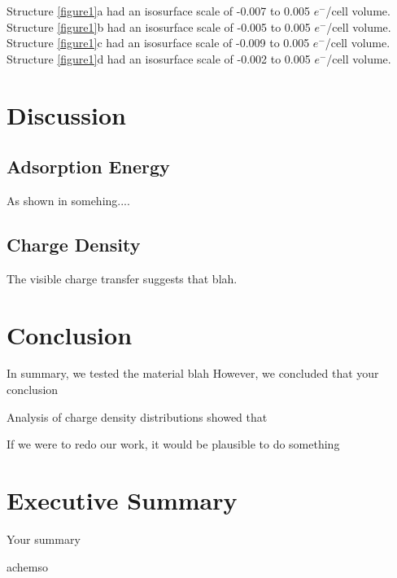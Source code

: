 \documentclass[journal=jacsat,manuscript=article]{achemso}
\begin{document}
Structure \ref{figure1}a had an isosurface scale of -0.007 to 0.005 $e^{-}$/cell volume. 
Structure \ref{figure1}b had an isosurface scale of -0.005 to 0.005 $e^{-}$/cell volume. 
Structure \ref{figure1}c had an isosurface scale of -0.009 to 0.005 $e^{-}$/cell volume. 
Structure \ref{figure1}d had an isosurface scale of -0.002 to 0.005 $e^{-}$/cell volume. 

\section{Discussion}

\subsection{Adsorption Energy}

As shown in somehing....

\subsection{Charge Density}

The visible charge transfer suggests that  blah.

\section{Conclusion}

In summary, we tested the material blah
However, we concluded that  your conclusion

Analysis of charge density distributions showed that

If we were to redo our work, it would be plausible to do something

\newpage

\section{Executive Summary}

Your summary

\newpage
{}
{achemso}
%
\end{document}
